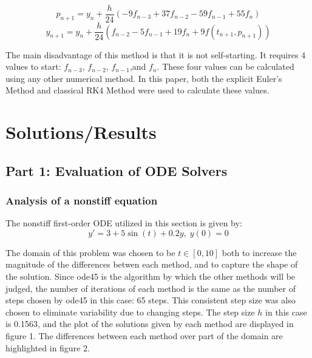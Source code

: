 \documentclass[11pt]{article}
\begin{document}
$$p_{n+1}=y_{n}+\frac{h}{24}(-9f_{n-3}+37f_{n-2}-59f_{n-1}+55f_{n})$$
$$y_{n+1}=y_{n}+\frac{h}{24}(f_{n-2}-5f_{n-1}+19f_{n}+9f(t_{n+1}, p_{n+1}))$$

The main disadvantage of this method is that it is not self-starting. It requires 
4 values to start: $f_{n-3}$, $f_{n-2}$, $f_{n-1}$,and $f_{n}$. These four values 
can be calculated using any other numerical method. In this paper, both the 
explicit Euler's Method and classical RK4 Method were used to calculate these values.

\section{Solutions/Results}\label{S:4}

\subsection{Part 1: Evaluation of ODE Solvers}
%

\subsubsection{Analysis of a nonstiff equation}
%

The nonstiff first-order ODE utilized in this section is given by:
$$y'=3+5\sin(t)+0.2y,\; y(0)=0$$

The domain of this problem was chosen to be $t\in [0,10]$ both to increase the 
magnitude of the differences betwen each method, and to capture the shape of
the solution. Since ode45 is the algorithm by which the other methods will be judged, 
the number of iterations of each method is the same as the number of steps chosen
by ode45 in this case: 65 steps. This consistent step size was also chosen to 
eliminate variability due to changing steps. The step size $h$ in this case is
0.1563, and the plot of the solutions given by each method are displayed in figure
1. The differences between each method over part of the domain are highlighted in figure 2.
\end{document}
